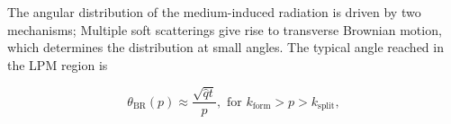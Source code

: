 %
%
%
%
%
%
%
%


The angular distribution of the medium-induced radiation is driven by two mechanisms; Multiple soft scatterings give rise to transverse Brownian motion, which determines the distribution at small angles. The typical angle reached in the LPM region is 

\begin{equation}
\theta_\mathrm{BR}\left(p\right) \approx \frac{\sqrt{\hat q t}}{p}, \text{ for } k_\mathrm{form} > p > k_\mathrm{split},
\end{equation}

